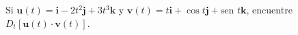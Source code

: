 \item Si $\mathbf{u}(t) = \mathbf{i} - 2t^2\mathbf{j} + 3t^3\mathbf{k}$ y $\mathbf{v}(t) = t\mathbf{i} + \cos t \mathbf{j} + \text{sen } t \mathbf{k}$, encuentre $D_t[\mathbf{u}(t) \cdot \mathbf{v}(t)]$.
